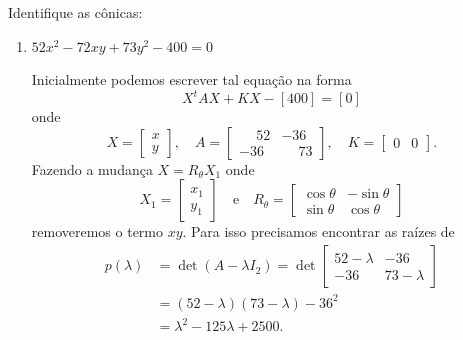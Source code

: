 \begin{exemplos}
    Identifique as cônicas:
    \begin{enumerate}
        \item $52x^2 - 72xy + 73y^2 - 400 = 0$
              \begin{solucao}
                  Inicialmente podemos escrever tal equação na forma
                  \[
                      X^t A X + KX - [400] = [0]
                  \]
                  onde
                  \[
                      X = \begin{bmatrix}
                          x \\y
                      \end{bmatrix}, \quad A = \begin{bmatrix}
                          \phantom{-}52 & -36           \\
                          -36           & \phantom{-}73
                      \end{bmatrix},\quad K = \begin{bmatrix}
                          0 & 0
                      \end{bmatrix}.
                  \]
                  Fazendo a mudança $X = R_\theta X_1$ onde
                  \[
                      X_1 = \begin{bmatrix}
                          x_1 \\y_1
                      \end{bmatrix} \quad\mbox{e}\quad R_\theta = \begin{bmatrix}
                          \cos\theta & -\sin\theta \\
                          \sin\theta & \cos\theta
                      \end{bmatrix}
                  \]
                  removeremos o termo $xy$. Para isso precisamos encontrar as raízes de
                  \begin{align*}
                      p(\lambda) & = \det (A - \lambda I_2) = \det \begin{bmatrix}
                                                                       52 - \lambda & -36          \\
                                                                       -36          & 73 - \lambda
                                                                   \end{bmatrix} \\ &= (52 - \lambda)(73 - \lambda) - 36^2 \\ &= \lambda^2 - 125\lambda + 2500.

\end{align*}
\end{solucao}
\end{enumerate}
\end{exemplos}
